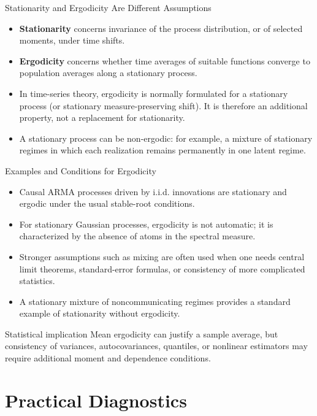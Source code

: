\documentclass{beamer}
\begin{document}
\begin{frame}{Stationarity and Ergodicity Are Different Assumptions}
  \begin{itemize}
    \item \textbf{Stationarity} concerns invariance of the process distribution, or of selected moments, under time shifts.
    \item \textbf{Ergodicity} concerns whether time averages of suitable functions converge to population averages along a stationary process.
    \item In time-series theory, ergodicity is normally formulated for a stationary process (or stationary measure-preserving shift). It is therefore an additional property, not a replacement for stationarity.
    \item A stationary process can be non-ergodic: for example, a mixture of stationary regimes in which each realization remains permanently in one latent regime.
  \end{itemize}
\end{frame}
\begin{frame}{Examples and Conditions for Ergodicity}
  \begin{itemize}
    \item Causal ARMA processes driven by i.i.d. innovations are stationary and ergodic under the usual stable-root conditions.
    \item For stationary Gaussian processes, ergodicity is not automatic; it is characterized by the absence of atoms in the spectral measure.
    \item Stronger assumptions such as mixing are often used when one needs central limit theorems, standard-error formulas, or consistency of more complicated statistics.
    \item A stationary mixture of noncommunicating regimes provides a standard example of stationarity without ergodicity.
  \end{itemize}
  \begin{alertblock}{Statistical implication}
    Mean ergodicity can justify a sample average, but consistency of variances, autocovariances, quantiles, or nonlinear estimators may require additional moment and dependence conditions.
  \end{alertblock}
\end{frame}

\section{Practical Diagnostics}
\end{document}
